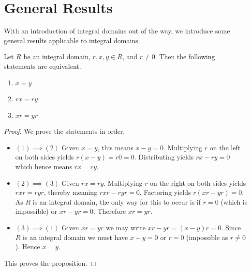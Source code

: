 \section{General Results}
With an introduction of integral domains out of the way, we introduce some general results applicable to integral domains.
\begin{proposition}
    Let $R$ be an integral domain, $r, x, y \in R$, and $r \neq 0$. Then the following statements are equivalent.
    \begin{enumerate}[label=(\arabic*)]
        \item $x = y$
        \item $rx = ry$
        \item $xr = yr$
    \end{enumerate}
\end{proposition}
\begin{proof}
    We prove the statements in order.
    \begin{itemize}
        \item $\boxed{(1) \implies (2)}$ Given $x = y$, this means $x - y = 0$. Multiplying $r$ on the left on both sides yields $r(x-y) = r0 = 0$. Distributing yields $rx - ry = 0$ which hence means $rx = ry$.
        
        \item $\boxed{(2) \implies (3)}$ Given $rx = ry$. Multiplying $r$ on the right on both sides yields $rxr = ryr$, thereby meaning $rxr - ryr = 0$. Factoring yields $r(xr - yr) = 0$. As $R$ is an integral domain, the only way for this to occur is if $r = 0$ (which is impossible) or $xr - yr = 0$. Therefore $xr = yr$.
        
        \item $\boxed{(3) \implies (1)}$ Given $xr = yr$ we may write $xr - yr = (x-y)r = 0$. Since $R$ is an integral domain we must have $x - y = 0$ or $r = 0$ (impossible as $r \neq 0$). Hence $x = y$.
    \end{itemize}
    This proves the proposition.
\end{proof}

\newpage


